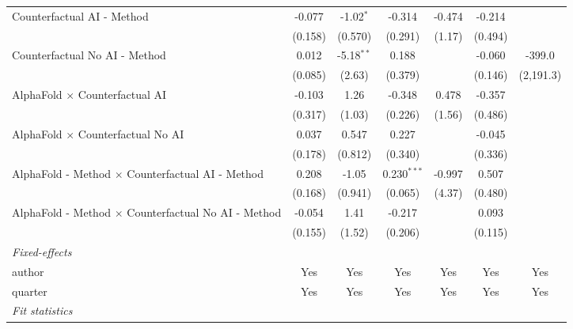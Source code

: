 \begin{tabular}{lcccccc}
   Counterfactual AI - Method                                 & -0.077       & -1.02$^{*}$  & -0.314        & -0.474 & -0.214  &   \\   
                                                              & (0.158)      & (0.570)      & (0.291)       & (1.17) & (0.494) &   \\   
   Counterfactual No AI - Method                              & 0.012        & -5.18$^{**}$ & 0.188         &        & -0.060  & -399.0\\   
                                                              & (0.085)      & (2.63)       & (0.379)       &        & (0.146) & (2,191.3)\\   
   AlphaFold $\times$ Counterfactual AI                       & -0.103       & 1.26         & -0.348        & 0.478  & -0.357  &   \\   
                                                              & (0.317)      & (1.03)       & (0.226)       & (1.56) & (0.486) &   \\   
   AlphaFold $\times$ Counterfactual No AI                    & 0.037        & 0.547        & 0.227         &        & -0.045  &   \\   
                                                              & (0.178)      & (0.812)      & (0.340)       &        & (0.336) &   \\   
   AlphaFold - Method $\times$ Counterfactual AI - Method     & 0.208        & -1.05        & 0.230$^{***}$ & -0.997 & 0.507   &   \\   
                                                              & (0.168)      & (0.941)      & (0.065)       & (4.37) & (0.480) &   \\   
   AlphaFold - Method $\times$ Counterfactual No AI - Method  & -0.054       & 1.41         & -0.217        &        & 0.093   &   \\   
                                                              & (0.155)      & (1.52)       & (0.206)       &        & (0.115) &   \\   
   \midrule
   \emph{Fixed-effects}\\
   author                                                     & Yes          & Yes          & Yes           & Yes    & Yes     & Yes\\  
   quarter                                                    & Yes          & Yes          & Yes           & Yes    & Yes     & Yes\\  
   \midrule
   \emph{Fit statistics}\\

\end{tabular}
